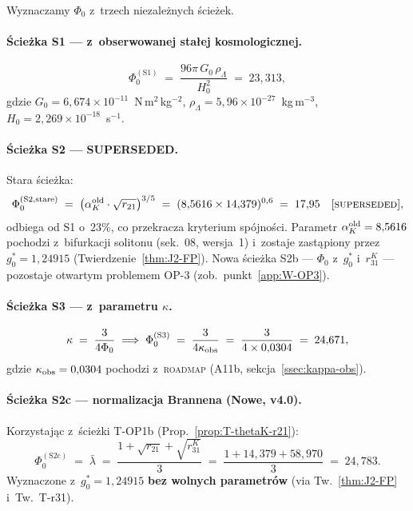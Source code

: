 Wyznaczamy $\Phi_0$ z~trzech niezale\.znych \'{s}cie\.zek.

\paragraph{\'{S}cie\.zka S1 — z~obserwowanej sta\l{}ej kosmologicznej.}
\begin{equation}\label{eq:W-S1}
  \Phi_0^{(\mathrm{S1})}
  \;=\; \frac{96\pi\,G_0\,\rho_\Lambda}{H_0^2}
  \;=\; 23{,}313,
\end{equation}
gdzie $G_0 = 6{,}674\times 10^{-11}$~N\,m$^2$\,kg$^{-2}$,
$\rho_\Lambda = 5{,}96\times 10^{-27}$~kg\,m$^{-3}$,
$H_0 = 2{,}269\times 10^{-18}$~s$^{-1}$.

\paragraph{\'{S}cie\.zka S2 — SUPERSEDED.}
Stara \'{s}cie\.zka:
\begin{equation}\label{eq:W-S2-old}
  \Phi_0^{(\mathrm{S2, stare})}
  \;=\; \bigl(\alpha_K^{\rm old} \cdot \sqrt{r_{21}}\bigr)^{3/5}
  \;=\; (8{,}5616 \times 14{,}379)^{0{,}6}
  \;=\; 17{,}95
  \quad [\textsc{superseded}],
\end{equation}
odbiega od S1 o~$23\%$, co przekracza kryterium sp\'ojno\'{s}ci.
Parametr $\alpha_K^{\rm old} = 8{,}5616$ pochodzi z~bifurkacji
solitonu (sek.~08, wersja~1) i~zostaje zast\k{a}piony przez
$g_0^* = 1{,}24915$ (Twierdzenie~\ref{thm:J2-FP}).
Nowa \'{s}cie\.zka S2b — $\Phi_0$ z~$g_0^*$ i~$r_{31}^K$ —
pozostaje otwartym problemem OP-3
(zob.~punkt~\ref{app:W-OP3}).

\paragraph{\'{S}cie\.zka S3 — z~parametru $\kappa$.}
\begin{equation}\label{eq:W-S3}
  \kappa \;=\; \frac{3}{4\Phi_0}
  \;\Longrightarrow\;
  \Phi_0^{(\mathrm{S3})}
  \;=\; \frac{3}{4\kappa_{\rm obs}}
  \;=\; \frac{3}{4\times 0{,}0304}
  \;=\; 24{,}671,
\end{equation}
gdzie $\kappa_{\rm obs} = 0{,}0304$ pochodzi z~\textsc{roadmap}
(A11b, sekcja~\ref{ssec:kappa-obs}).

\paragraph{\'{S}cie\.zka S2c — normalizacja Brannena (Nowe, v4.0).}%
\label{par:W-S2c}
Korzystaj\k{a}c z~\'{s}cie\.zki T-OP1b (Prop.~\ref{prop:T-thetaK-r21}):
\begin{equation}\label{eq:W-S2c}
  \Phi_0^{(\mathrm{S2c})}
  \;=\; \bar\lambda
  \;=\; \frac{1 + \sqrt{r_{21}} + \sqrt{r_{31}^K}}{3}
  \;=\; \frac{1 + 14{,}379 + 58{,}970}{3}
  \;=\; 24{,}783.
\end{equation}
Wyznaczone z~$g_0^* = 1{,}24915$ \textbf{bez wolnych parametr\'ow}
(via Tw.~\ref{thm:J2-FP} i~Tw.~T-r31).

